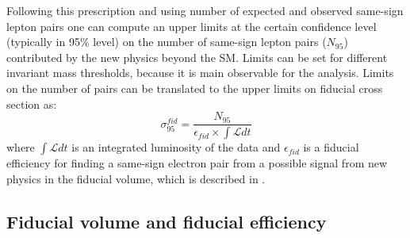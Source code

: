 Following this prescription and using number of expected and observed same-sign lepton pairs one can compute 
an upper limits at the certain confidence level (typically in 95$\%$ level) on the number of same-sign lepton pairs ($N_{95}$)
contributed by the new physics beyond the SM. Limits can be set for different invariant mass thresholds, because it is main observable for the analysis.
Limits on the number of pairs can be translated to the upper limits on fiducial cross section as:
\begin{equation}
 \sigma_{95}^{fid} = \dfrac{N_{95}}{\epsilon_{fid} \times \int \mathscr{L} dt}
 \label{eq:fid_cross_section}
\end{equation}
where $\int \mathscr{L} dt$ is an integrated luminosity of the data and $\epsilon_{fid}$ is a fiducial efficiency for finding a same-sign electron pair from
a possible signal from new physics in the fiducial volume, which is described in .


\subsection{Fiducial volume and fiducial efficiency}
\label{subsec:fid_volume_eff}

